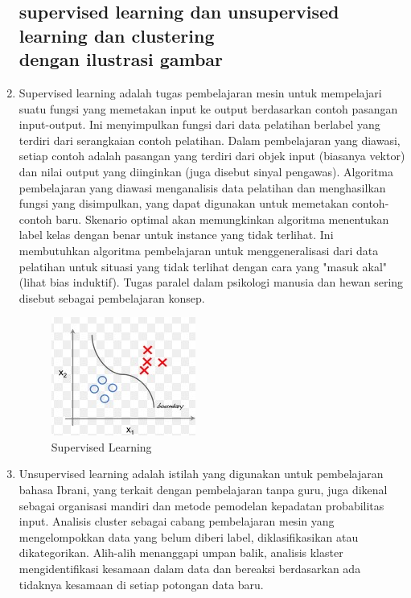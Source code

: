 \begin{enumerate}
\subsection{supervised learning dan unsupervised learning dan clustering\\ dengan ilustrasi gambar}

\item Supervised learning adalah tugas pembelajaran mesin untuk mempelajari suatu fungsi yang memetakan input ke output berdasarkan contoh pasangan input-output. Ini menyimpulkan fungsi dari data pelatihan berlabel yang terdiri dari serangkaian contoh pelatihan. Dalam pembelajaran yang diawasi, setiap contoh adalah pasangan yang terdiri dari objek input (biasanya vektor) dan nilai output yang diinginkan (juga disebut sinyal pengawas). Algoritma pembelajaran yang diawasi menganalisis data pelatihan dan menghasilkan fungsi yang disimpulkan, yang dapat digunakan untuk memetakan contoh-contoh baru. Skenario optimal akan memungkinkan algoritma menentukan label kelas dengan benar untuk instance yang tidak terlihat. Ini membutuhkan algoritma pembelajaran untuk menggeneralisasi dari data pelatihan untuk situasi yang tidak terlihat dengan cara yang "masuk akal" (lihat bias induktif). Tugas paralel dalam psikologi manusia dan hewan sering disebut sebagai pembelajaran konsep.

\begin{figure}[ht]
\centering
\includegraphics[scale=0.5]{figures/f2.jpg}
\caption{Supervised Learning}
\label{contoh}
\end{figure}

\item Unsupervised learning adalah istilah yang digunakan untuk pembelajaran bahasa Ibrani, yang terkait dengan pembelajaran tanpa guru, juga dikenal sebagai organisasi mandiri dan metode pemodelan kepadatan probabilitas input. Analisis cluster sebagai cabang pembelajaran mesin yang mengelompokkan data yang belum diberi label, diklasifikasikan atau dikategorikan. Alih-alih menanggapi umpan balik, analisis klaster mengidentifikasi kesamaan dalam data dan bereaksi berdasarkan ada tidaknya kesamaan di setiap potongan data baru.


\end{enumerate}
